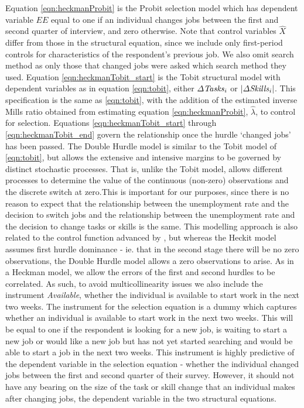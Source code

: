 \documentclass[11pt, oneside]{article}
\begin{document}
Equation \ref{eqn:heckmanProbit} is the Probit selection model which has dependent variable $EE$ equal to one if an individual changes jobs between the first and second quarter of interview, and zero otherwise. Note that control variables $\hat{X}$ differ from those in the structural equation, since we include only first-period controls for characteristics of the respondent's previous job. We also omit search method as only those that changed jobs were asked which search method they used.  Equation \ref{eqn:heckmanTobit_start} is the Tobit structural model with dependent variables as in equation \ref{eqn:tobit}, either $\Delta\text{\textit{Tasks}}_{i}$ or $|\Delta\text{\textit{Skills}}_{i}|$. This specification is the same as \ref{eqn:tobit}, with the addition of the estimated inverse Mills ratio obtained from estimating equation \ref{eqn:heckmanProbit}, $\hat{\lambda}$, to control for selection. Equations \ref{eqn:heckmanTobit_start} through \ref{eqn:heckmanTobit_end} govern the relationship once the hurdle `changed jobs' has been passed.  The Double Hurdle model is similar to the Tobit model of \ref{eqn:tobit}, but allows the extensive and intensive margins to be governed by distinct stochastic processes. That is, unlike the Tobit model, allows different processes to determine the value of the continuous (non-zero) observations and the discrete switch at zero.This is important for our purposes, since there is no reason to expect that the relationship between the unemployment rate and the decision to switch jobs and the relationship between the unemployment rate and the decision to change tasks or skills is the same. This modelling approach is also related to the control function advanced by \cite{Heckman}, but whereas the Heckit model assumes first hurdle dominance - ie. that in the second stage there will be no zero observations, the Double Hurdle model allows a zero observations to arise. As in a Heckman model, we allow the errors of the first and second hurdles to be correlated. As such, to avoid multicollinearity issues we also include the instrument \textit{Available}, whether the individual is available to start work in the next two weeks. The instrument for the selection equation is a dummy which captures whether an individual is available to start work in the next two weeks. This will be equal to one if the respondent is looking for a new job, is waiting to start a new job or would like a new job but has not yet started searching and would be able to start a job in the next two weeks. This instrument is highly predictive of the dependent variable in the selection equation - whether the individual changed jobs between the first and second quarter of their survey. However, it should not have any bearing on the size of the task or skill change that an individual makes after changing jobs, the dependent variable in the two structural equations. 
	
\end{document}
